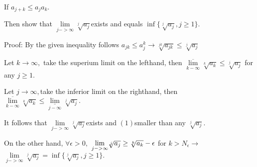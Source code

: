 \documentclass{article}
\begin{document}
If $a_{j+k}\leq a_{j}a_{k}.$

Then show that $\underset{j->\infty }{\lim }\sqrt[j]{a_{j}}$exists and
equals $\inf \{\sqrt[j]{a_{j}},j\geq 1\}.$

Proof: By the given inequality follows $a_{jk}\leq a_{j}^{k}\rightarrow \sqrt%
[jk]{a_{jk}}\leq \sqrt[j]{a_{j}}$

Let $k\rightarrow \infty ,$ take the superium limit on the lefthand, then $%
\underset{k-\infty }{\overline{\lim }}\sqrt[k]{a_{k}}\leq \sqrt[j]{a_{j}}$%
for any $j\geq 1.$

Let $j\rightarrow \infty ,$take the inferior limit on the righthand, then  $%
\underset{k-\infty }{\overline{\lim }}\sqrt[k]{a_{k}}\leq \underset{j-\infty 
}{\underline{\lim }}\sqrt[j]{a_{j}}.$

It follows that  $\underset{j->\infty }{\lim }\sqrt[j]{a_{j}}$exists and $%
\left( 1\right) $smaller than any $\sqrt[j]{a_{j}}.$

On the other hand, $\forall \epsilon >0,$ $\underset{j->\infty }{\lim }\sqrt[%
j]{a_{j}}\geq \sqrt[k]{a_{k}}-\epsilon $ for $k>N_{\epsilon }\rightarrow $ $%
\underset{j->\infty }{\lim }\sqrt[j]{a_{j}}=\inf \{\sqrt[j]{a_{j}},j\geq 1\}.
$
\end{document}
